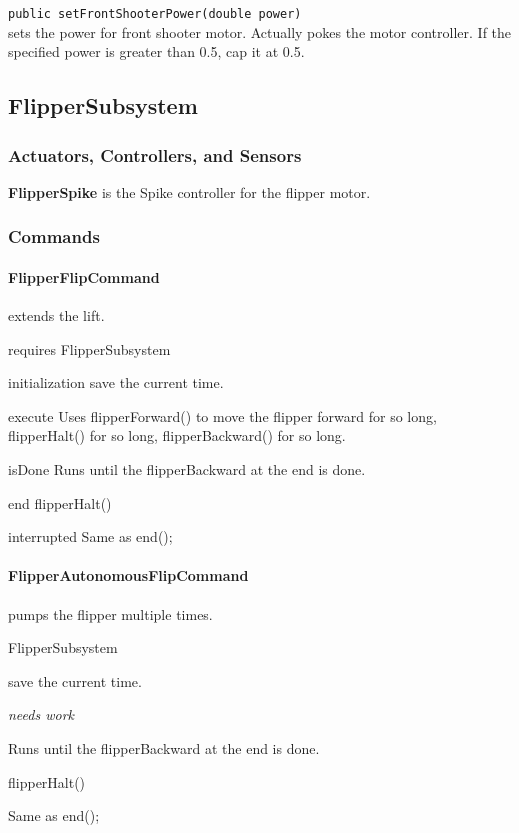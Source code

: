 \documentclass[]{article}
\begin{document}
\noindent
\lstinline[]|public setFrontShooterPower(double power)| \\
sets the power for front shooter motor. Actually pokes the motor controller. If the specified power is greater than 0.5, cap it at 0.5.


\subsection{FlipperSubsystem}

\subsubsection{Actuators, Controllers, and Sensors}

\textbf{FlipperSpike} is the Spike controller for the flipper motor.

\subsubsection{Commands}

\paragraph{FlipperFlipCommand} extends the lift.
\begin{description}[topsep=0ex]
\item[requires] FlipperSubsystem
\item[initialization]  save the current time.
\item[execute] Uses flipperForward() to move the flipper forward for so long, flipperHalt() for so long, flipperBackward() for so long.
\item[isDone] Runs until the flipperBackward at the end is done.
\item[end] flipperHalt()
\item[interrupted] Same as end();
\end{description}

\paragraph{FlipperAutonomousFlipCommand} pumps the flipper multiple times.
\begin{description}[topsep=0ex]
\item[requires] FlipperSubsystem
\item[initialization]  save the current time.
\item[execute] \emph{needs work}
\item[isDone] Runs until the flipperBackward at the end is done.
\item[end] flipperHalt()
\item[interrupted] Same as end();
\end{description}
\end{document}
